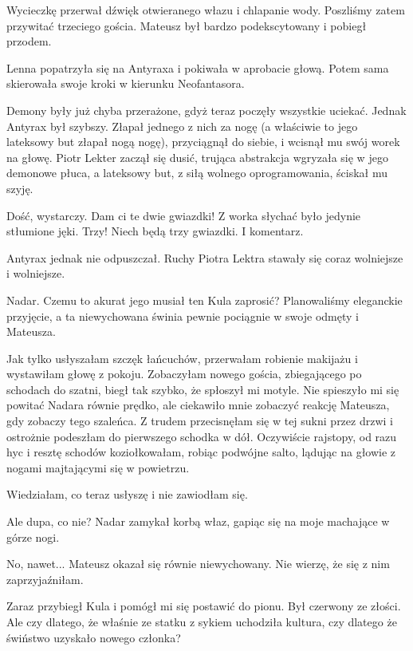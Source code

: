 Wycieczkę przerwał dźwięk otwieranego włazu i chlapanie wody.
Poszliśmy zatem przywitać trzeciego gościa. Mateusz był bardzo podekscytowany i pobiegł przodem.

\divider{}

Lenna popatrzyła się na Antyraxa i pokiwała w aprobacie głową.
Potem sama skierowała swoje kroki w kierunku Neofantasora.

Demony były już chyba przerażone, gdyż teraz poczęły wszystkie uciekać.
Jednak Antyrax był szybszy. Złapał jednego z nich za nogę (a właściwie to jego lateksowy but złapał nogą nogę), przyciągnął do siebie, i wcisnął mu swój worek na głowę.
Piotr Lekter zaczął się dusić, trująca abstrakcja wgryzała się w jego demonowe płuca, a lateksowy but, z siłą wolnego oprogramowania, ściskał mu szyję.

\ds{} Dość, wystarczy. Dam ci te dwie gwiazdki! \dm{} Z worka słychać było jedynie stłumione jęki. \dm{} Trzy! Niech będą trzy gwiazdki. I komentarz. \de{}

Antyrax jednak nie odpuszczał. Ruchy Piotra Lektra stawały się coraz wolniejsze i wolniejsze.

\divider{}

Nadar. Czemu to akurat jego musiał ten Kula zaprosić?
Planowaliśmy eleganckie przyjęcie, a ta niewychowana świnia pewnie pociągnie w swoje odmęty i Mateusza.

Jak tylko usłyszałam szczęk łańcuchów, przerwałam robienie makijażu i wystawiłam głowę z pokoju.
Zobaczyłam nowego gościa, zbiegającego po schodach do szatni, biegł tak szybko, że spłoszył mi motyle.
Nie spieszyło mi się powitać Nadara równie prędko, ale ciekawiło mnie zobaczyć reakcję Mateusza, gdy zobaczy tego szaleńca.
Z trudem przecisnęłam się w tej sukni przez drzwi i ostrożnie podeszłam do pierwszego schodka w dół.
Oczywiście rajstopy, od razu hyc i resztę schodów koziołkowałam, robiąc podwójne salto, lądując na głowie z nogami majtającymi się w powietrzu.

Wiedziałam, co teraz usłyszę i nie zawiodłam się.

\ds{} Ale dupa, co nie? \dm{} Nadar zamykał korbą właz, gapiąc się na moje machające w górze nogi. \de{}

\ds{} No, nawet... \dm{} Mateusz okazał się równie niewychowany. Nie wierzę, że się z nim zaprzyjaźniłam. \de{}

Zaraz przybiegł Kula i pomógł mi się postawić do pionu. Był czerwony ze złości.
Ale czy dlatego, że właśnie ze statku z sykiem uchodziła kultura, czy dlatego że świństwo uzyskało nowego członka?


